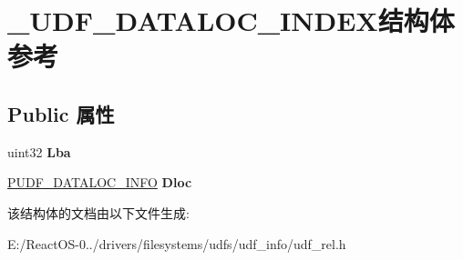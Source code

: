 \hypertarget{struct___u_d_f___d_a_t_a_l_o_c___i_n_d_e_x}{}\section{\+\_\+\+U\+D\+F\+\_\+\+D\+A\+T\+A\+L\+O\+C\+\_\+\+I\+N\+D\+E\+X结构体 参考}
\label{struct___u_d_f___d_a_t_a_l_o_c___i_n_d_e_x}
\subsection*{Public 属性}
\begin{DoxyCompactItemize}
\item 
\mbox{\label{struct___u_d_f___d_a_t_a_l_o_c___i_n_d_e_x_afe6d80b0c43088d7b236234df10d593a}} 
uint32 {\bfseries Lba}
\item 
\mbox{\label{struct___u_d_f___d_a_t_a_l_o_c___i_n_d_e_x_a0d1a113ff9979635e3d65923972c3cd4}} 
\hyperlink{struct___u_d_f___d_a_t_a_l_o_c___i_n_f_o}{P\+U\+D\+F\+\_\+\+D\+A\+T\+A\+L\+O\+C\+\_\+\+I\+N\+FO} {\bfseries Dloc}
\end{DoxyCompactItemize}


该结构体的文档由以下文件生成\+:\begin{DoxyCompactItemize}
\item 
E\+:/\+React\+O\+S-\/0../drivers/filesystems/udfs/udf\+\_\+info/udf\+\_\+rel.\+h\end{DoxyCompactItemize}
